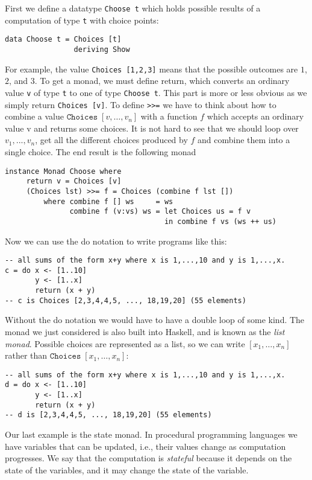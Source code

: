 \documentclass[a4paper,10pt]{article}
\newcommand{\cc}[1]{\lstinline{#1}}
\begin{document}
First we define a datatype \cc{Choose t} which holds possible results of a
computation of type \cc{t} with choice points:
% 
\begin{lstlisting}
data Choose t = Choices [t]
                deriving Show
\end{lstlisting}
% 
For example, the value \cc{Choices [1,2,3]} means that the possible outcomes
are $1$, $2$, and $3$. To get a monad, we must define return, which converts
an ordinary value \cc{v} of type \cc{t} to one of type \cc{Choose t}. This
part is more or less obvious as we simply return \cc{Choices [v]}.
% 
To define \cc{>>=} we have to think about how to combine a value
$\mathtt{Choices}\;[v, \ldots, v_n]$ with a function $f$ which accepts an
ordinary value v and returns some choices. It is not hard to see that we
should loop over $v_1, ..., v_n$, get all the different choices produced by
$f$ and combine them into a single choice. The end result is the following
monad
% 
\begin{lstlisting}
instance Monad Choose where
     return v = Choices [v]
     (Choices lst) >>= f = Choices (combine f lst [])
         where combine f [] ws     = ws
               combine f (v:vs) ws = let Choices us = f v
                                     in combine f vs (ws ++ us)
\end{lstlisting}
% 
Now we can use the do notation to write programs like this:
% 
\begin{lstlisting}
-- all sums of the form x+y where x is 1,...,10 and y is 1,...,x.
c = do x <- [1..10]
       y <- [1..x]
       return (x + y)
-- c is Choices [2,3,4,4,5, ..., 18,19,20] (55 elements)
\end{lstlisting}
% 
Without the do notation we would have to have a double loop of some kind. The
monad we just considered is also built into Haskell, and is known as the
\emph{list monad}. Possible choices are represented as a list, so we can write
$[x_1, \ldots, x_n]$ rather than $\mathtt{Choices}\; [x_1, \ldots, x_n]$:
% 
\begin{lstlisting}
-- all sums of the form x+y where x is 1,...,10 and y is 1,...,x.
d = do x <- [1..10]
       y <- [1..x]
       return (x + y)
-- d is [2,3,4,4,5, ..., 18,19,20] (55 elements)
\end{lstlisting}

Our last example is the state monad. In procedural programming languages we
have variables that can be updated, i.e., their values change as computation
progresses. We say that the computation is \emph{stateful} because it depends
on the state of the variables, and it may change the state of the variable.
\end{document}
